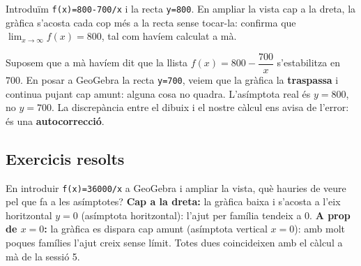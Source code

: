 \begin{exemple}
Introduïm \texttt{f(x)=800-700/x} i la recta \texttt{y=800}. En ampliar la vista cap a
la dreta, la gràfica s'acosta cada cop més a la recta sense tocar-la: confirma que
$\lim_{x\to\infty}f(x)=800$, tal com havíem calculat a mà.

\begin{center}

\end{center}
\end{exemple}

\begin{exemple}
Suposem que a mà havíem dit que la llista $f(x)=800-\dfrac{700}{x}$ s'estabilitza en
$700$. En posar a GeoGebra la recta \texttt{y=700}, veiem que la gràfica la
\textbf{traspassa} i continua pujant cap amunt: alguna cosa no quadra. L'asímptota real
és $y=800$, no $y=700$. La discrepància entre el dibuix i el nostre càlcul ens avisa de
l'error: és una \textbf{autocorrecció}.
\end{exemple}

\subsection{Exercicis resolts}

\begin{exresolt}
En introduir \texttt{f(x)=36000/x} a GeoGebra i ampliar la vista, què hauries de veure
pel que fa a les asímptotes?
\solucio
\textbf{Cap a la dreta:} la gràfica baixa i s'acosta a l'eix horitzontal $y=0$
(asímptota horitzontal): l'ajut per família tendeix a $0$. \textbf{A prop de $x=0$:}
la gràfica es dispara cap amunt (asímptota vertical $x=0$): amb molt poques famílies
l'ajut creix sense límit. Totes dues coincideixen amb el càlcul a mà de la sessió 5.
\end{exresolt}

